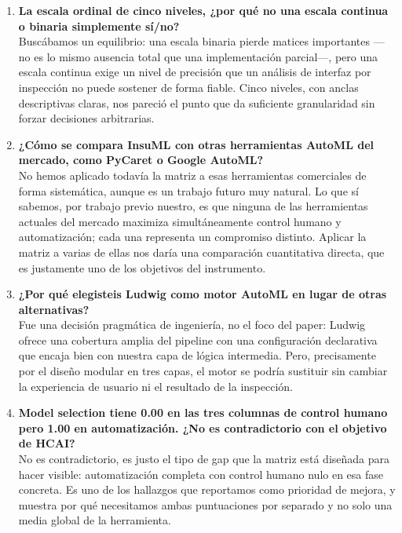\documentclass[11pt,a4paper]{article}
\begin{document}
\begin{enumerate}[leftmargin=*]
\item \textbf{La escala ordinal de cinco niveles, ¿por qué no una escala continua o binaria simplemente sí/no?}\\
Buscábamos un equilibrio: una escala binaria pierde matices importantes —no es lo mismo ausencia total que una implementación parcial—, pero una escala continua exige un nivel de precisión que un análisis de interfaz por inspección no puede sostener de forma fiable. Cinco niveles, con anclas descriptivas claras, nos pareció el punto que da suficiente granularidad sin forzar decisiones arbitrarias.

\item \textbf{¿Cómo se compara InsuML con otras herramientas AutoML del mercado, como PyCaret o Google AutoML?}\\
No hemos aplicado todavía la matriz a esas herramientas comerciales de forma sistemática, aunque es un trabajo futuro muy natural. Lo que sí sabemos, por trabajo previo nuestro, es que ninguna de las herramientas actuales del mercado maximiza simultáneamente control humano y automatización; cada una representa un compromiso distinto. Aplicar la matriz a varias de ellas nos daría una comparación cuantitativa directa, que es justamente uno de los objetivos del instrumento.

\item \textbf{¿Por qué elegisteis Ludwig como motor AutoML en lugar de otras alternativas?}\\
Fue una decisión pragmática de ingeniería, no el foco del paper: Ludwig ofrece una cobertura amplia del pipeline con una configuración declarativa que encaja bien con nuestra capa de lógica intermedia. Pero, precisamente por el diseño modular en tres capas, el motor se podría sustituir sin cambiar la experiencia de usuario ni el resultado de la inspección.

\item \textbf{Model selection tiene 0.00 en las tres columnas de control humano pero 1.00 en automatización. ¿No es contradictorio con el objetivo de HCAI?}\\
No es contradictorio, es justo el tipo de gap que la matriz está diseñada para hacer visible: automatización completa con control humano nulo en esa fase concreta. Es uno de los hallazgos que reportamos como prioridad de mejora, y muestra por qué necesitamos ambas puntuaciones por separado y no solo una media global de la herramienta.

\end{enumerate}
\end{document}
